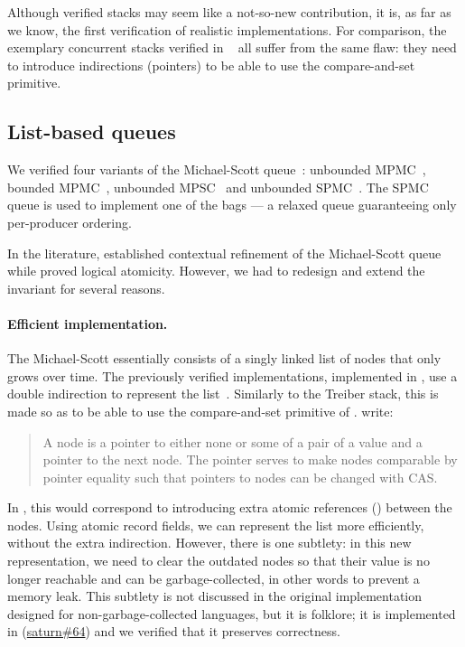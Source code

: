Although verified stacks may seem like a not-so-new contribution, it is, as far as we know, the first verification of realistic \OCaml implementations.
For comparison, the exemplary concurrent stacks verified in \Iris~\citep{iris-examples} all suffer from the same flaw: they need to introduce indirections (pointers) to be able to use the compare-and-set primitive.

\subsection{List-based queues}

We verified four variants of the Michael-Scott queue~\citep{DBLP:conf/podc/MichaelS96}: unbounded MPMC~, bounded MPMC~, unbounded MPSC~ and unbounded SPMC~.
The SPMC queue is used to implement one of the bags --- a relaxed queue guaranteeing only per-producer ordering.

In the \Iris literature, \citet{DBLP:conf/cpp/VindumB21} established contextual refinement of the Michael-Scott queue while \citet{DBLP:journals/pacmpl/MulderK23} proved logical atomicity.
However, we had to redesign and extend the invariant for several reasons.

\paragraph{Efficient implementation.}\label{par:michael-scott-cleanup}
The Michael-Scott essentially consists of a singly linked list of nodes that only grows over time.
The previously verified implementations, implemented in \HeapLang, use a double indirection to represent the list~\citep[\figurename~2]{DBLP:conf/cpp/VindumB21}.
Similarly to the Treiber stack, this is made so as to be able to use the compare-and-set primitive of \HeapLang. \citet{DBLP:conf/cpp/VindumB21} write:
\begin{quotation}
  A node is a pointer to either none or some of a pair of a value and a pointer to the next node.
  The pointer serves to make nodes comparable by pointer equality such that pointers to nodes can be changed with CAS.
\end{quotation}
In \OCaml, this would correspond to introducing extra atomic references () between the nodes.
Using atomic record fields, we can represent the list more efficiently, without the extra indirection.
However, there is one subtlety: in this new representation, we need to clear the outdated nodes so that their value is no longer reachable and can be garbage-collected, in other words to prevent a memory leak.
This subtlety is not discussed in the original implementation~\citep{DBLP:conf/podc/MichaelS96} designed for non-garbage-collected languages, but it is folklore; it is implemented in \Saturn (\href{https://github.com/ocaml-multicore/saturn/pull/64}{saturn\#64}) and we verified that it preserves correctness.

